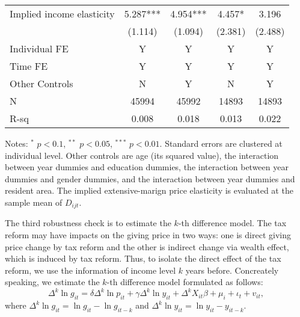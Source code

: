 \documentclass[
]{article}
\begin{document}
\begin{table}
\begin{threeparttable}
\begin{tabular}[t]{lcccc}
\hspace{1em}Implied income elasticity & 5.287*** & 4.954*** & 4.457* & 3.196\\
\hspace{1em} & (1.114) & (1.094) & (2.381) & (2.488)\\
\hspace{1em}Individual FE & Y & Y & Y & Y\\
\hspace{1em}Time FE & Y & Y & Y & Y\\
\hspace{1em}Other Controls & N & Y & N & Y\\
\hspace{1em}N & 45994 & 45992 & 14893 & 14893\\
\hspace{1em}R-sq & 0.008 & 0.018 & 0.013 & 0.022\\
\bottomrule
\end{tabular}
\begin{tablenotes}
\item Notes: $^{*}$ $p < 0.1$, $^{**}$ $p < 0.05$, $^{***}$ $p < 0.01$. Standard errors are clustered at individual level. Other controls are age (its squared value), the interaction between year dummies and education dummies, the interaction between year dummies and gender dummies, and the interaction between year dummies and resident area. The implied extensive-marign price elasticity is evaluated at the sample mean of $D_{ijt}$.
\end{tablenotes}
\end{threeparttable}
\end{table}

The third robustness check is to estimate the \(k\)-th difference model. The tax reform may have impacts on the giving price in two ways: one is direct giving price change by tax reform and the other is indirect change via wealth effect, which is induced by tax reform. Thus, to isolate the direct effect of the tax reform, we use the information of income level \(k\) years before.
Concreately speaking, we estimate the \(k\)-th difference model formulated as follows:
\[
\Delta^k \ln g_{it} = \delta \Delta^k \ln p_{it} + \gamma \Delta^k \ln y_{it} + \Delta^k X_{it} \beta + \mu_i + \iota_t + v_{it},
\]
where \(\Delta^k \ln g_{it} = \ln g_{it} - \ln g_{it-k}\) and \(\Delta^k \ln y_{it} = \ln y_{it} - y_{it-k}\).

\color{blue}
\end{document}
